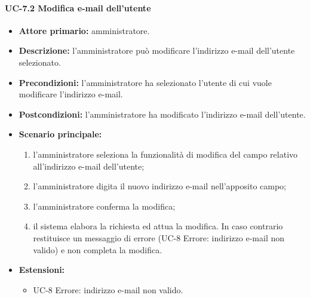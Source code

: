     \paragraph{UC-7.2 Modifica e-mail dell'utente}
    \begin{itemize}
        \item \textbf{Attore primario:} amministratore.
    
        \item \textbf{Descrizione:} l'amministratore può modificare l'indirizzo e-mail dell'utente selezionato.
        
        \item \textbf{Precondizioni:} l'amministratore ha selezionato l'utente di cui vuole modificare l'indirizzo e-mail.
    
        \item \textbf{Postcondizioni:} l'amministratore ha modificato l'indirizzo e-mail dell'utente.
    
        \item \textbf{Scenario principale:}
        \begin{enumerate}
            \item  l'amministratore seleziona la funzionalità di modifica del campo relativo all'indirizzo e-mail dell'utente;
            \item l'amministratore digita il nuovo indirizzo e-mail nell'apposito campo;
            \item l'amministratore conferma la modifica;
            \item il sistema elabora la richiesta ed attua la modifica. In caso contrario restituisce un messaggio di errore (UC-8 Errore: indirizzo e-mail non valido) e non completa la modifica.
        \end{enumerate}
        \item \textbf{Estensioni:}
              \begin{itemize}
                    \item UC-8 Errore: indirizzo e-mail non valido.
            \end{itemize}
    \end{itemize}


